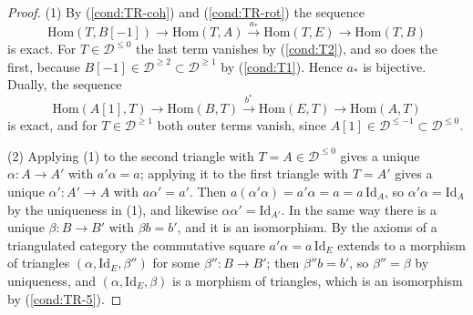 \documentclass[12pt]{amsart}
\newcommand{\condref}[1]{\textup{(\ref{#1})}}
\numberwithin{theorem}{section}
\theoremstyle{definition}
\newcommand{\Hom}{\mathrm{Hom}}
\newcommand{\id}{\mathrm{Id}}
\newcommand{\calD}{\mathcal{D}}
\newcommand{\Dle}[1]{\calD^{\leqslant #1}}
\newcommand{\Dge}[1]{\calD^{\geqslant #1}}
\begin{document}
	\begin{proof}
		(1) By \condref{cond:TR-coh} and \condref{cond:TR-rot} the sequence
		\[
		\Hom(T, B[-1]) \to \Hom(T, A) \xrightarrow{a_*} \Hom(T, E) \to \Hom(T, B)
		\]
		is exact.
		For $T \in \Dle{0}$ the last term vanishes by \condref{cond:T2}, and so does the first, because $B[-1] \in \Dge{2} \subset \Dge{1}$ by \condref{cond:T1}.
		Hence $a_*$ is bijective.
		Dually, the sequence 
		\[
		\Hom(A[1], T) \to \Hom(B, T) \xrightarrow{b^*} \Hom(E, T) \to \Hom(A, T)
		\] 
		is exact, and for $T \in \Dge{1}$ both outer terms vanish, since $A[1] \in \Dle{-1} \subset \Dle{0}$.
		
		(2) Applying (1) to the second triangle with $T = A \in \Dle{0}$ gives a unique $\alpha \colon A \to A'$ with $a' \alpha = a$;
		applying it to the first triangle with $T = A'$ gives a unique $\alpha' \colon A' \to A$ with $a \alpha' = a'$.
		Then $a (\alpha' \alpha) = a' \alpha = a = a \, \id_A$, so $\alpha' \alpha = \id_A$ by the uniqueness in (1), and likewise $\alpha \alpha' = \id_{A'}$.
		In the same way there is a unique $\beta \colon B \to B'$ with $\beta b = b'$, and it is an isomorphism.
		By the axioms of a triangulated category the commutative square $a' \alpha = a \, \id_E$ extends to a morphism of triangles $(\alpha, \id_E, \beta'')$ for some $\beta'' \colon B \to B'$;
		then $\beta'' b = b'$, so $\beta'' = \beta$ by uniqueness, and $(\alpha, \id_E, \beta)$ is a morphism of triangles, which is an isomorphism by \condref{cond:TR-5}.
	\end{proof}
	
\end{document}
